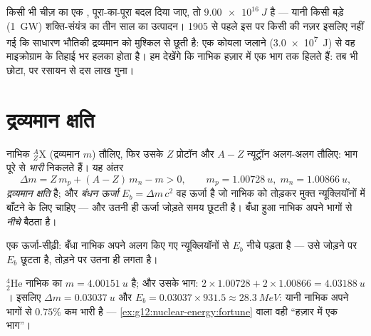 \begin{example}[सोया हुआ ख़ज़ाना]\label{ex:g12:nuclear-energy:fortune}
किसी भी चीज़ का एक , पूरा-का-पूरा बदल दिया जाए, तो $\qty{9.00e16}{J}$ है
--- यानी किसी बड़े (\qty{1}{GW}) शक्ति-संयंत्र का तीन साल का उत्पादन। 1905
से पहले इस पर किसी की नज़र इसलिए नहीं गई कि साधारण भौतिकी द्रव्यमान को मुश्किल
से छूती है: एक  कोयला जलाने (\qty{3.0e7}{J}) से वह माइक्रोग्राम के
तिहाई भर हलका होता है। हम देखेंगे कि नाभिक हज़ार में एक भाग तक हिलते हैं: तब भी
छोटा, पर रसायन से दस लाख गुना।
\end{example}

\section{द्रव्यमान क्षति}

\begin{definition}[द्रव्यमान क्षति और बंधन ऊर्जा]\label{def:g12:nuclear-energy:defect}
नाभिक ${}^{A}_{Z}\mathrm{X}$ (द्रव्यमान $m$) तौलिए, फिर उसके $Z$ प्रोटॉन और
$A - Z$ न्यूट्रॉन अलग-अलग तौलिए: भाग पूरे से \emph{भारी} निकलते हैं। यह अंतर
\[
\Delta m = Z\,m_p + (A - Z)\,m_n - m > 0,
\qquad m_p = \qty{1.00728}{u},\; m_n = \qty{1.00866}{u},
\]
\emph{द्रव्यमान क्षति} है; और \emph{बंधन
ऊर्जा} $E_b = \Delta m\,c^2$ वह ऊर्जा है जो नाभिक को
तोड़कर मुक्त न्यूक्लियॉनों में बाँटने के लिए चाहिए --- और उतनी ही
ऊर्जा जोड़ते समय छूटती है। बँधा हुआ नाभिक अपने भागों से
\emph{नीचे} बैठता है।
\end{definition}

\begin{omfigure}

{\small एक ऊर्जा-सीढ़ी: बँधा नाभिक अपने अलग किए गए
न्यूक्लियॉनों से $E_b$ नीचे पड़ता है --- उसे जोड़ने पर $E_b$ छूटता
है, तोड़ने पर उतना ही लगता है।}
\end{omfigure}

\begin{example}[हीलियम-4]\label{ex:g12:nuclear-energy:helium}
${}^{4}_{2}\mathrm{He}$ नाभिक का $m = \qty{4.00151}{u}$ है; और उसके भाग: $2 \times 1.00728 + 2 \times 1.00866 = \qty{4.03188}{u}$। इसलिए $\Delta m = \qty{0.03037}{u}$ और
$E_b = 0.03037 \times 931.5 \approx
\qty{28.3}{MeV}$: यानी नाभिक अपने भागों से $0.75\%$ कम भारी है --- \cref{ex:g12:nuclear-energy:fortune} वाला वही
``हज़ार में एक भाग''।
\end{example}

